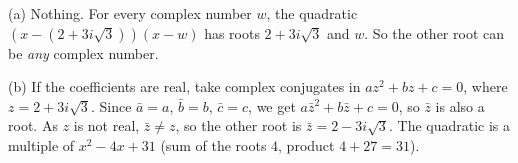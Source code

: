 (a) Nothing. For every complex number $w$, the quadratic $\left(x-(2+3i\sqrt3)\right)(x-w)$ has roots $2+3i\sqrt3$ and $w$. So the other root can be \emph{any} complex number.

(b) If the coefficients are real, take complex conjugates in $az^2+bz+c=0$, where $z=2+3i\sqrt3$. Since $\bar a=a$, $\bar b=b$, $\bar c=c$, we get $a\bar z^2+b\bar z+c=0$, so $\bar z$ is also a root. As $z$ is not real, $\bar z\ne z$, so the other root is $\bar z=\boxed{2-3i\sqrt3}$. The quadratic is a multiple of $x^2-4x+31$ (sum of the roots $4$, product $4+27=31$).
